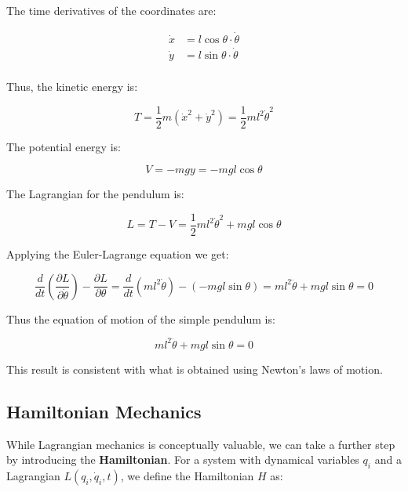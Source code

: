 The time derivatives of the coordinates are:

\begin{align*}
    \dot{x} &= l \cos{\theta} \cdot \dot{\theta} \\
    \dot{y} &= l \sin{\theta} \cdot \dot{\theta} \\
\end{align*}

Thus, the kinetic energy is:

\begin{equation}
    T=\frac{1}{2} m \left(\dot{x}^2+\dot{y}^2\right) = \frac{1}{2} ml^2\dot{\theta}^2
\end{equation}

The potential energy is:

\begin{equation}
    V=-mgy=-mgl\cos{\theta}
\end{equation}

The Lagrangian for the pendulum is:

\begin{equation}
    L=T-V=\frac{1}{2}ml^2\dot{\theta}^2+mgl\cos{\theta}
\end{equation}

Applying the Euler-Lagrange equation we get:

\begin{equation}
    \frac{d}{dt}\left(\frac{\partial L}{\partial\dot{\theta}}\right) - \frac{\partial L}{\partial\theta} = \frac{d}{dt}(ml^2\dot{\theta}) - (-mgl\sin{\theta})=ml^2\ddot{\theta}+mgl\sin{\theta}=0
\end{equation}

Thus the equation of motion of the simple pendulum is:

\begin{equation}
    ml^2\ddot{\theta}+mgl\sin{\theta}=0
\end{equation}

This result is consistent with what is obtained using Newton's laws of motion.

\subsection{Hamiltonian Mechanics}

While Lagrangian mechanics is conceptually valuable, we can take a further step by 
introducing the \textbf{Hamiltonian}. For a system with dynamical variables $q_i$ and a 
Lagrangian $L(q_i, \dot{q}_i, t)$, we define the Hamiltonian $H$ as:


